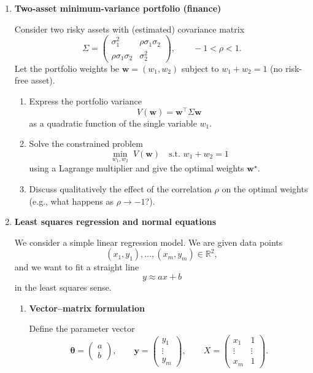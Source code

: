 \documentclass[11pt]{article}
\begin{document}
\begin{enumerate}
\bigskip
\item \textbf{Two-asset minimum-variance portfolio (finance)}

Consider two risky assets with (estimated) covariance matrix
\[
\Sigma = \begin{pmatrix}
\sigma_1^2 & \rho \sigma_1 \sigma_2 \\
\rho \sigma_1 \sigma_2 & \sigma_2^2
\end{pmatrix},\qquad -1<\rho<1.
\]
Let the portfolio weights be $\bm{w}=(w_1,w_2)$ subject to $w_1+w_2=1$ (no risk-free asset).

\begin{enumerate}
\item Express the portfolio variance
\[
V(\bm{w}) = \bm{w}^\top \Sigma \bm{w}
\]
as a quadratic function of the single variable $w_1$.
\item Solve the constrained problem
\[
\min_{w_1,w_2} \; V(\bm{w}) \quad \text{s.t. } w_1+w_2=1
\]
using a Lagrange multiplier and give the optimal weights $\bm{w}^\star$.
\item Discuss qualitatively the effect of the correlation $\rho$ on the optimal weights (e.g., what happens as $\rho\to -1$?).
\end{enumerate}

\bigskip

\item \textbf{Least squares regression and normal equations}

We consider a simple linear regression model. We are given data points
\[
(x_1,y_1),\dots,(x_m,y_m)\in\mathbb{R}^2,
\]
and we want to fit a straight line
\[
y \approx a x + b
\]
in the least squares sense.

\begin{enumerate}

\item \textbf{Vector–matrix formulation}

Define the parameter vector
\[
\bm{\theta} =
\begin{pmatrix}
a\\[2mm]
b
\end{pmatrix},
\qquad
\bm{y} =
\begin{pmatrix}
y_1\\
\vdots\\
y_m
\end{pmatrix},
\qquad
X =
\begin{pmatrix}
x_1 & 1\\
\vdots & \vdots\\
x_m & 1
\end{pmatrix}.
\]


\end{enumerate}
\end{enumerate}
\end{document}
